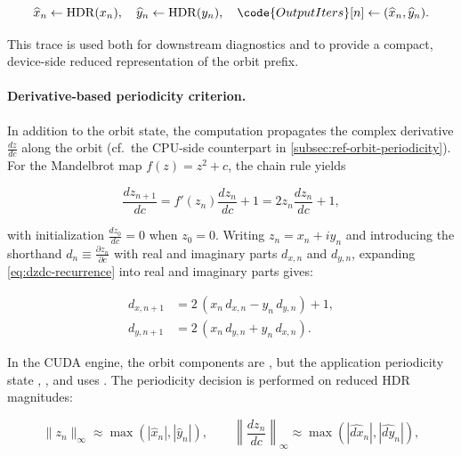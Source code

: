 \begin{equation}
  \widehat{x}_n \leftarrow \mathrm{HDR}(x_n), \quad
  \widehat{y}_n \leftarrow \mathrm{HDR}(y_n), \quad
  \code{OutputIters}[n] \leftarrow (\widehat{x}_n, \widehat{y}_n).
  \label{eq:hdr-extraction}
\end{equation}

This trace is used both for downstream diagnostics and to provide a compact,
device-side reduced representation of the orbit prefix.

\paragraph{Derivative-based periodicity criterion.}

In addition to the orbit state, the computation propagates the complex derivative
\(
\frac{dz}{dc}
\)
along the orbit (cf.\ the CPU-side counterpart in \cref{subsec:ref-orbit-periodicity}). For the Mandelbrot map \(f(z)=z^2+c\), the chain rule yields

\begin{equation}
  \frac{d z_{n+1}}{d c} = f'(z_n)\frac{d z_n}{d c} + 1
  = 2 z_n \frac{d z_n}{d c} + 1,
  \label{eq:dzdc-recurrence}
\end{equation}

with initialization \(\frac{dz_0}{dc}=0\) when \(z_0=0\).
Writing \(z_n = x_n + i y_n\) and introducing the shorthand
\(d_n \equiv \frac{\partial z_n}{\partial c}\) with real and imaginary parts
\(d_{x,n}\) and \(d_{y,n}\), expanding
\eqref{eq:dzdc-recurrence} into real and imaginary parts gives:

\begin{align}
  d_{x,n+1} &= 2\,(x_n\, d_{x,n} - y_n\, d_{y,n}) + 1, \label{eq:dzdc-real}\\
  d_{y,n+1} &= 2\,(x_n\, d_{y,n} + y_n\, d_{x,n}). \label{eq:dzdc-imag}
\end{align}

In the CUDA engine, the orbit components are , but the
application periodicity state , , and 
uses .  The periodicity decision is performed on reduced HDR
magnitudes:

\begin{equation}
  \lVert z_n\rVert_\infty \approx \max(|\widehat{x}_n|, |\widehat{y}_n|), \qquad
  \left\lVert\frac{dz_n}{dc}\right\rVert_\infty \approx \max(|\widehat{d x}_n|, |\widehat{d y}_n|),
  \label{eq:reduced-norms}
\end{equation}

